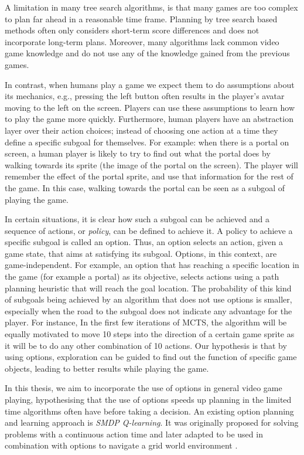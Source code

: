 A limitation in many tree search algorithms, is that many games are too complex
to plan far ahead in a reasonable time frame. Planning by tree search based
methods often only considers short-term score differences and does not
incorporate long-term plans. Moreover, many algorithms lack common video game
knowledge and do not use any of the knowledge gained from the previous games.

In contrast, when humans play a game we expect them to do assumptions about its
mechanics, e.g., pressing the left button often results in the player's avatar
moving to the left on the screen. Players can use these assumptions to learn how
to play the game more quickly. Furthermore, human players have an abstraction
layer over their action choices; instead of choosing one action at a time they
define a specific subgoal for themselves.  For example: when there is a portal
on screen, a human player is likely to try to find out what the portal does by
walking towards its sprite (the image of the portal on the screen). The player
will remember the effect of the portal sprite, and use that information for the
rest of the game. In this case, walking towards the portal can be seen as a
subgoal of playing the game.

In certain situations, it is clear how such a subgoal can be achieved and a
sequence of actions, or \emph{policy}, can be defined to achieve it. A policy to
achieve a specific subgoal is called an option. Thus, an option selects an
action, given a game state, that aims at satisfying its subgoal. Options, in
this context, are game-independent. For example, an option that has reaching a
specific location in the game (for example a portal) as its objective, selects
actions using a path planning heuristic that will reach the goal location. 
The probability of this kind of subgoals being achieved by an algorithm that
does not use options is smaller, especially when the road to the subgoal does
not indicate any advantage for the player. For instance, In the first few
iterations of MCTS, the algorithm will be equally motivated to move 10 steps
into the direction of a certain game sprite as it will be to do any other
combination of 10 actions. Our hypothesis is that by using options, exploration
can be guided to find out the function of specific game objects, leading to
better results while playing the game.

In this thesis, we aim to incorporate the use of options in general video game
playing, hypothesising that the use of options speeds up planning in the limited
time algorithms often have before taking a decision. An existing option planning
and learning approach is \emph{SMDP Q-learning}. It was originally proposed for
solving problems with a continuous action time \cite{duff1995reinforcement} and
later adapted to be used in combination with options to
navigate a grid world environment \cite{sutton1999between, stolle2002learning}.

